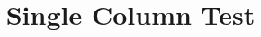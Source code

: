 \documentclass{article}
\title{Single Column Test}
\begin{document}
\maketitle
\makeversionapprovaltable
\end{document}
